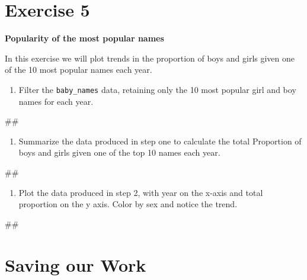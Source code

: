 \documentclass[]{book}
\newenvironment{Shaded}{\begin{snugshade}}{\end{snugshade}}
\newcommand{\NormalTok}[1]{#1}
\providecommand{\tightlist}{%
  \setlength{\itemsep}{0pt}\setlength{\parskip}{0pt}}
\begin{document}
\section{Exercise 5}\label{exercise-5}

\textbf{Popularity of the most popular names}

In this exercise we will plot trends in the proportion of boys and girls
given one of the 10 most popular names each year.

\begin{enumerate}
\def\labelenumi{\arabic{enumi}.}
\tightlist
\item
  Filter the \texttt{baby\_names} data, retaining only the 10 most
  popular girl and boy names for each year.
\end{enumerate}

\begin{Shaded}
\begin{Highlighting}[]
\NormalTok{##}
\end{Highlighting}
\end{Shaded}

\begin{enumerate}
\def\labelenumi{\arabic{enumi}.}
\setcounter{enumi}{1}
\tightlist
\item
  Summarize the data produced in step one to calculate the total
  Proportion of boys and girls given one of the top 10 names each year.
\end{enumerate}

\begin{Shaded}
\begin{Highlighting}[]
\NormalTok{##}
\end{Highlighting}
\end{Shaded}

\begin{enumerate}
\def\labelenumi{\arabic{enumi}.}
\setcounter{enumi}{2}
\tightlist
\item
  Plot the data produced in step 2, with year on the x-axis and total
  proportion on the y axis. Color by sex and notice the trend.
\end{enumerate}

\begin{Shaded}
\begin{Highlighting}[]
\NormalTok{##}
\end{Highlighting}
\end{Shaded}

\section{Saving our Work}\label{saving-our-work}
\end{document}

